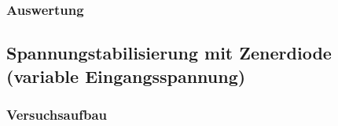 \documentclass[12pt,a4paper]{article}
\begin{document}
\subsubsection{Auswertung}
\subsection{Spannungstabilisierung mit Zenerdiode (variable Eingangsspannung)}
\subsubsection{Versuchsaufbau}
\end{document}

